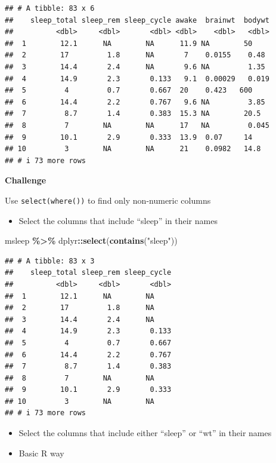 \documentclass[
]{book}
\newenvironment{Shaded}{\begin{snugshade}}{\end{snugshade}}
\newcommand{\FunctionTok}[1]{\textcolor[rgb]{0.13,0.29,0.53}{\textbf{#1}}}
\newcommand{\NormalTok}[1]{#1}
\newcommand{\SpecialCharTok}[1]{\textcolor[rgb]{0.81,0.36,0.00}{\textbf{#1}}}
\newcommand{\StringTok}[1]{\textcolor[rgb]{0.31,0.60,0.02}{#1}}
\providecommand{\tightlist}{%
  \setlength{\itemsep}{0pt}\setlength{\parskip}{0pt}}
\begin{document}
\begin{verbatim}
## # A tibble: 83 x 6
##    sleep_total sleep_rem sleep_cycle awake  brainwt  bodywt
##          <dbl>     <dbl>       <dbl> <dbl>    <dbl>   <dbl>
##  1        12.1      NA        NA      11.9 NA        50    
##  2        17         1.8      NA       7    0.0155    0.48 
##  3        14.4       2.4      NA       9.6 NA         1.35 
##  4        14.9       2.3       0.133   9.1  0.00029   0.019
##  5         4         0.7       0.667  20    0.423   600    
##  6        14.4       2.2       0.767   9.6 NA         3.85 
##  7         8.7       1.4       0.383  15.3 NA        20.5  
##  8         7        NA        NA      17   NA         0.045
##  9        10.1       2.9       0.333  13.9  0.07     14    
## 10         3        NA        NA      21    0.0982   14.8  
## # i 73 more rows
\end{verbatim}

\textbf{Challenge}

Use \texttt{select(where())} to find only non-numeric columns

\begin{itemize}
\tightlist
\item
  Select the columns that include ``sleep'' in their names
\end{itemize}

\begin{Shaded}
\begin{Highlighting}[]
\NormalTok{msleep }\SpecialCharTok{\%\textgreater{}\%}
\NormalTok{  dplyr}\SpecialCharTok{::}\FunctionTok{select}\NormalTok{(}\FunctionTok{contains}\NormalTok{(}\StringTok{"sleep"}\NormalTok{))}
\end{Highlighting}
\end{Shaded}

\begin{verbatim}
## # A tibble: 83 x 3
##    sleep_total sleep_rem sleep_cycle
##          <dbl>     <dbl>       <dbl>
##  1        12.1      NA        NA    
##  2        17         1.8      NA    
##  3        14.4       2.4      NA    
##  4        14.9       2.3       0.133
##  5         4         0.7       0.667
##  6        14.4       2.2       0.767
##  7         8.7       1.4       0.383
##  8         7        NA        NA    
##  9        10.1       2.9       0.333
## 10         3        NA        NA    
## # i 73 more rows
\end{verbatim}

\begin{itemize}
\item
  Select the columns that include either ``sleep'' or ``wt'' in their names
\item
  Basic R way
\end{itemize}
\end{document}
